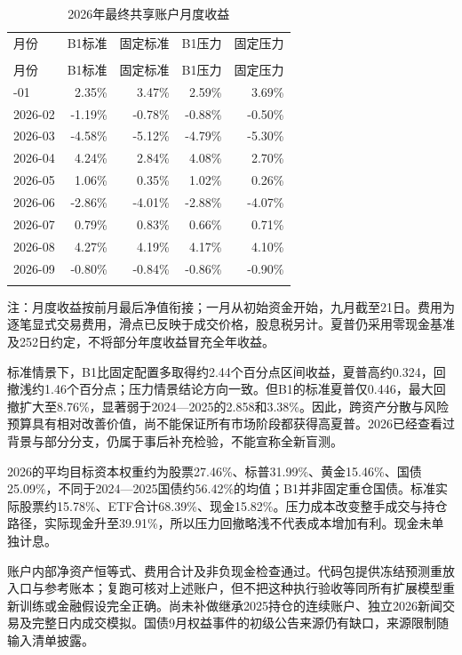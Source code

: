 \documentclass[12pt]{article}
\newcommand{\toprule}{\noalign{\hrule height .8pt}}
\newcommand{\midrule}{\noalign{\hrule height .4pt}}
\newcommand{\bottomrule}{\noalign{\hrule height .8pt}}
\begin{document}
{\small
\begin{longtable}{@{}lrrrr@{}}
\caption{2026年最终共享账户月度收益}\label{tab:final2026monthly}\\
\toprule
月份 & B1标准 & 固定标准 & B1压力 & 固定压力 \\
\midrule\endfirsthead
\multicolumn{5}{c}{表\thetable（续）}\\\toprule
月份 & B1标准 & 固定标准 & B1压力 & 固定压力 \\
\midrule\endhead
2026-01 & 2.35\% & 3.47\% & 2.59\% & 3.69\% \\
2026-02 & -1.19\% & -0.78\% & -0.88\% & -0.50\% \\
2026-03 & -4.58\% & -5.12\% & -4.79\% & -5.30\% \\
2026-04 & 4.24\% & 2.84\% & 4.08\% & 2.70\% \\
2026-05 & 1.06\% & 0.35\% & 1.02\% & 0.26\% \\
2026-06 & -2.86\% & -4.01\% & -2.88\% & -4.07\% \\
2026-07 & 0.79\% & 0.83\% & 0.66\% & 0.71\% \\
2026-08 & 4.27\% & 4.19\% & 4.17\% & 4.10\% \\
2026-09 & -0.80\% & -0.84\% & -0.86\% & -0.90\% \\
\bottomrule\end{longtable}}
{\footnotesize\noindent 注：月度收益按前月最后净值衔接；一月从初始资金开始，九月截至21日。费用为逐笔显式交易费用，滑点已反映于成交价格，股息税另计。夏普仍采用零现金基准及252日约定，不将部分年度收益冒充全年收益。\par}

标准情景下，B1比固定配置多取得约2.44个百分点区间收益，夏普高约0.324，回撤浅约1.46个百分点；压力情景结论方向一致。但B1的标准夏普仅0.446，最大回撤扩大至8.76\%，显著弱于2024—2025的2.858和3.38\%。因此，跨资产分散与风险预算具有相对改善价值，尚不能保证所有市场阶段都获得高夏普。2026已经查看过背景与部分分支，仍属于事后补充检验，不能宣称全新盲测。

2026的平均目标资本权重约为股票27.46\%、标普31.99\%、黄金15.46\%、国债25.09\%，不同于2024—2025国债约56.42\%的均值；B1并非固定重仓国债。标准实际股票约15.78\%、ETF合计68.39\%、现金15.82\%。压力成本改变整手成交与持仓路径，实际现金升至39.91\%，所以压力回撤略浅不代表成本增加有利。现金未单独计息。

账户内部净资产恒等式、费用合计及非负现金检查通过。代码包提供冻结预测重放入口与参考账本；复跑可核对上述账户，但不把这种执行验收等同所有扩展模型重新训练或金融假设完全正确。尚未补做继承2025持仓的连续账户、独立2026新闻交易及完整日内成交模拟。国债9月权益事件的初级公告来源仍有缺口，来源限制随输入清单披露。
\end{document}
